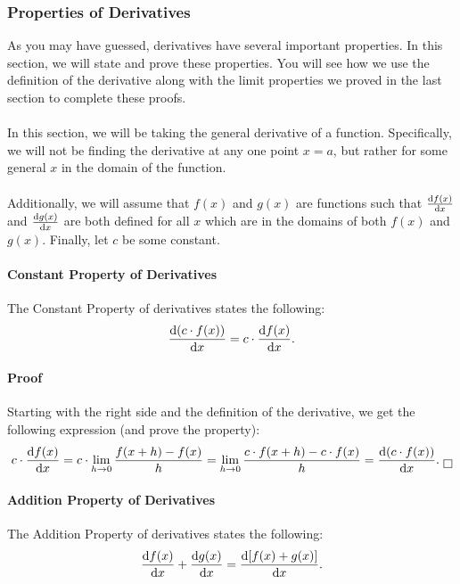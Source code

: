 \documentclass{article}
\begin{document}
\subsubsection{Properties of Derivatives}
As you may have guessed, derivatives have several important properties. In this section, we will state and prove these properties. You will see how we use the definition of the derivative along with the limit properties we proved in the last section to complete these proofs.
\\
\\
In this section, we will be taking the general derivative of a function. Specifically, we will not be finding the derivative at any one point $x=a$, but rather for some general $x$ in the domain of the function. 
\\
\\
Additionally, we will assume that $f(x)$ and $g(x)$ are functions such that $\diff{f(x)}{x}$ and $\diff{g(x)}{x}$ are both defined for all $x$ which are in the domains of both $f(x)$ and $g(x)$. Finally, let $c$ be some constant.

\paragraph{Constant Property of Derivatives} The Constant Property of derivatives states the following:
\[\diff{(c\cdot f(x))}{x}=c\cdot \diff{f(x)}{x}.\]

\paragraph{Proof} Starting with the right side and the definition of the derivative, we get the following expression (and prove the property):
\[c\cdot \diff{f(x)}{x}=c\cdot \lim_{h\to 0}\frac{f(x+h)-f(x)}{h}=\lim_{h\to 0}\frac{c\cdot f(x+h)-c\cdot f(x)}{h}=\diff{(c\cdot f(x))}{x}.\text{ }\boxed{}\]

\paragraph{Addition Property of Derivatives} The Addition Property of derivatives states the following: 
\[\diff{f(x)}{x}+\diff{g(x)}{x}=\diff{[f(x)+g(x)]}{x}.\]
\end{document}
